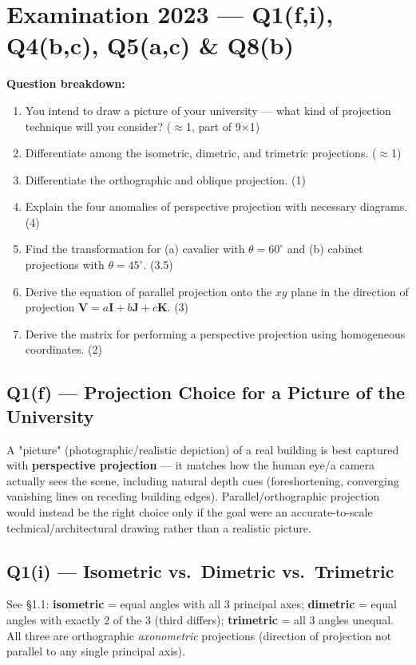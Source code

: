 \documentclass[12pt, a4paper]{article}
\newenvironment{solutionbox}{\begin{mdframed}[style=solutionframe]}{\end{mdframed}}
\newenvironment{answerbox}{\begin{mdframed}[style=answerframe]}{\end{mdframed}}
\begin{document}
\section{Examination 2023 --- Q1(f,i), Q4(b,c), Q5(a,c) \& Q8(b)}
\begin{solutionbox}
\textbf{Question breakdown:}
\begin{enumerate}[noitemsep]
  \item[Q1(f)] You intend to draw a picture of your university --- what kind of projection technique will you consider? ($\approx$1, part of 9$\times$1)
  \item[Q1(i)] Differentiate among the isometric, dimetric, and trimetric projections. ($\approx$1)
  \item[Q4(b)] Differentiate the orthographic and oblique projection. (1)
  \item[Q4(c)] Explain the four anomalies of perspective projection with necessary diagrams. (4)
  \item[Q5(a)] Find the transformation for (a) cavalier with $\theta=60^\circ$ and (b) cabinet projections with $\theta=45^\circ$. (3.5)
  \item[Q5(c)] Derive the equation of parallel projection onto the $xy$ plane in the direction of projection $\mathbf V=a\mathbf I+b\mathbf J+c\mathbf K$. (3)
  \item[Q8(b)] Derive the matrix for performing a perspective projection using homogeneous coordinates. (2)
\end{enumerate}
\end{solutionbox}

\subsection*{Q1(f) --- Projection Choice for a Picture of the University}
\begin{answerbox}
A "picture" (photographic/realistic depiction) of a real building is best captured with \textbf{perspective projection} --- it matches how the human eye/a camera actually sees the scene, including natural depth cues (foreshortening, converging vanishing lines on receding building edges). Parallel/orthographic projection would instead be the right choice only if the goal were an accurate-to-scale technical/architectural drawing rather than a realistic picture.
\end{answerbox}

\subsection*{Q1(i) --- Isometric vs.\ Dimetric vs.\ Trimetric}
\begin{answerbox}
See \S1.1: \textbf{isometric} = equal angles with all 3 principal axes; \textbf{dimetric} = equal angles with exactly 2 of the 3 (third differs); \textbf{trimetric} = all 3 angles unequal. All three are orthographic \emph{axonometric} projections (direction of projection not parallel to any single principal axis).
\end{answerbox}
\end{document}
